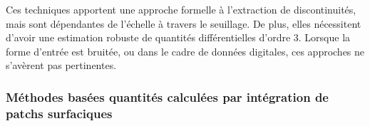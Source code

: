 Ces techniques apportent une approche formelle à l'extraction de discontinuités,
mais sont dépendantes de l'échelle à travers le seuillage. De plus, elles
nécessitent d'avoir une estimation robuste de quantités différentielles d'ordre
$3$. Lorsque la forme d'entrée est bruitée, ou dans le cadre de données
digitales, ces approches ne s'avèrent pas pertinentes.


%

\subsubsection{Méthodes basées quantités calculées par intégration de patchs surfaciques}
\label{sec:applications:feature:patch}

